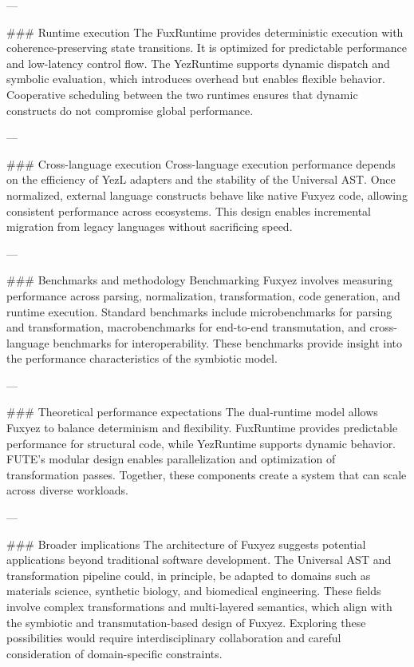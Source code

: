 \begin{enumerate}
---

\#\#\# Runtime execution  
The FuxRuntime provides deterministic execution with coherence-preserving state transitions. It is optimized for predictable performance and low-latency control flow. The YezRuntime supports dynamic dispatch and symbolic evaluation, which introduces overhead but enables flexible behavior. Cooperative scheduling between the two runtimes ensures that dynamic constructs do not compromise global performance.

---

\#\#\# Cross-language execution  
Cross-language execution performance depends on the efficiency of YezL adapters and the stability of the Universal AST. Once normalized, external language constructs behave like native Fuxyez code, allowing consistent performance across ecosystems. This design enables incremental migration from legacy languages without sacrificing speed.

---

\#\#\# Benchmarks and methodology  
Benchmarking Fuxyez involves measuring performance across parsing, normalization, transformation, code generation, and runtime execution. Standard benchmarks include microbenchmarks for parsing and transformation, macrobenchmarks for end-to-end transmutation, and cross-language benchmarks for interoperability. These benchmarks provide insight into the performance characteristics of the symbiotic model.

---

\#\#\# Theoretical performance expectations  
The dual‑runtime model allows Fuxyez to balance determinism and flexibility. FuxRuntime provides predictable performance for structural code, while YezRuntime supports dynamic behavior. FUTE’s modular design enables parallelization and optimization of transformation passes. Together, these components create a system that can scale across diverse workloads.

---

\#\#\# Broader implications  
The architecture of Fuxyez suggests potential applications beyond traditional software development. The Universal AST and transformation pipeline could, in principle, be adapted to domains such as materials science, synthetic biology, and biomedical engineering. These fields involve complex transformations and multi-layered semantics, which align with the symbiotic and transmutation-based design of Fuxyez. Exploring these possibilities would require interdisciplinary collaboration and careful consideration of domain-specific constraints.
    

\end{enumerate}

